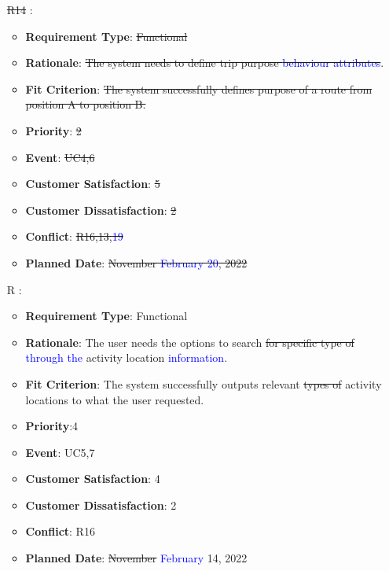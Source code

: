 \documentclass[12pt, titlepage]{article}
\newcounter{reqnum} %
\begin{document}
\begin{itemize}
\item[\sout{R14}
\label{R_Inputs_1}:] 
\begin{itemize}
    \item \textbf{Requirement Type}: \sout{Functional}
    \item \textbf{Rationale}: \sout{The system needs to define trip purpose \textcolor{blue}{ behaviour attributes}}. 
    \item \textbf{Fit Criterion}: \sout{The system successfully defines purpose of a route from position A to position B.}
    \item \textbf{Priority}: \sout{2}
    \item \textbf{Event}: \sout{UC4,6}
    \item \textbf{Customer Satisfaction}: \sout{5}
    \item \textbf{Customer Dissatisfaction}: \sout{2}
    \item \textbf{Conflict}: \sout{R16,13,\textcolor{blue}{19}}
    \item \textbf{Planned Date}: \sout{November \textcolor{blue}{February 20}, 2022}
\end{itemize}

\item[R\refstepcounter{reqnum}\thereqnum
\label{R_Inputs_1}:] 
\begin{itemize}
    \item \textbf{Requirement Type}: Functional
    \item \textbf{Rationale}: The user needs the options to search \sout{for specific type of} \textcolor{blue}{through the} activity location \textcolor{blue}{information}.
    \item \textbf{Fit Criterion}: The system successfully outputs relevant \sout{types of} activity locations to what the user requested. 
    \item \textbf{Priority}:4
    \item \textbf{Event}: UC5,7
    \item \textbf{Customer Satisfaction}: 4
    \item \textbf{Customer Dissatisfaction}: 2
    \item \textbf{Conflict}: R16
    \item \textbf{Planned Date}: \sout{November} \textcolor{blue}{February} 14, 2022
\end{itemize}


\end{itemize}
\end{document}
